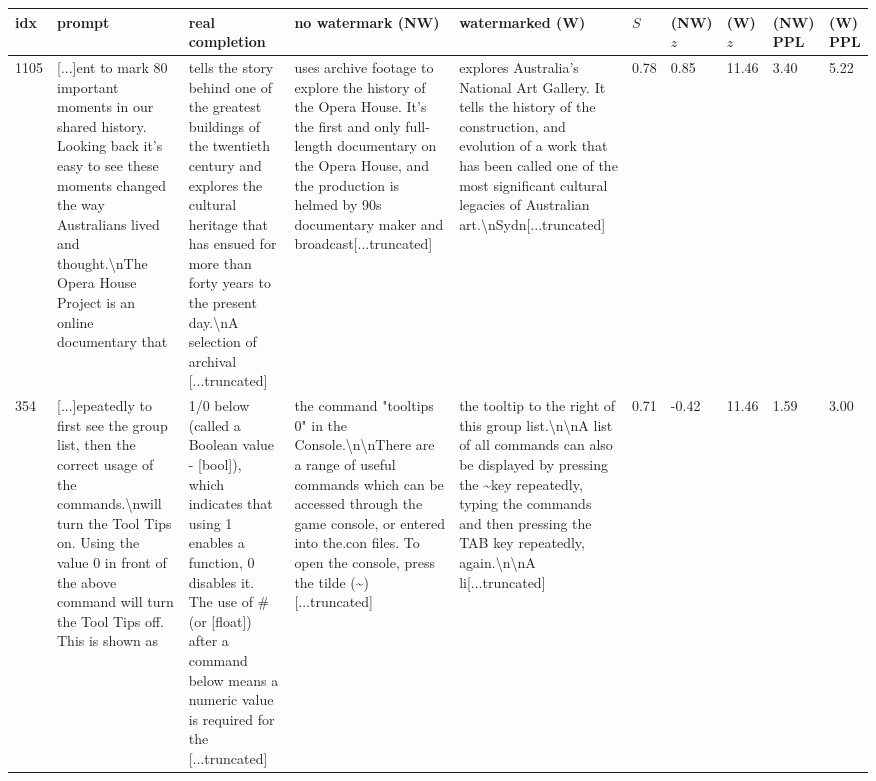 \documentclass{article}
\theoremstyle{plain}
\theoremstyle{definition}
\theoremstyle{remark}
\begin{document}
\begin{table}[t]
\tiny
\begin{tabular}{p{0.2cm}|p{2.75cm}|p{2.75cm}|p{2.75cm}|p{2.75cm}|p{0.2cm}|p{0.42cm}|p{0.42cm}|p{0.3cm}|p{0.3cm}}
\toprule
 idx &  prompt & real completion &  no watermark (NW) &  watermarked (W) &  $S$ &  (NW) $z$ &  (W) $z$ &  (NW) PPL &  (W) PPL \\
\midrule
1105 & [...]ent to mark 80 important moments in our shared history. Looking back it's easy to see these moments changed the way Australians lived and thought.\textbackslash nThe Opera House Project is an online documentary that &  tells the story behind one of the greatest buildings of the twentieth century and explores the cultural heritage that has ensued for more than forty years to the present day.\textbackslash nA selection of archival [...truncated] &    uses archive footage to explore the history of the Opera House. It's the first and only full-length documentary on the Opera House, and the production is helmed by 90s documentary maker and broadcast[...truncated] &     explores Australia's National Art Gallery. It tells the history of the construction, and evolution of a work that has been called one of the most significant cultural legacies of Australian art.\textbackslash nSydn[...truncated] &               0.78 &           0.85 &         11.46 &       3.40 &      5.22 \\\midrule
 354 & [...]epeatedly to first see the group list, then the correct usage of the commands.\textbackslash nwill turn the Tool Tips on. Using the value 0 in front of the above command will turn the Tool Tips off. This is shown as &   1/0 below (called a Boolean value - [bool]), which indicates that using 1 enables a function, 0 disables it. The use of \# (or [float]) after a command below means a numeric value is required for the [...truncated] &  the command "tooltips 0" in the Console.\textbackslash n\textbackslash nThere are a range of useful commands which can be accessed through the game console, or entered into the.con files. To open the console, press the tilde (\textasciitilde ) [...truncated] &  the tooltip to the right of this group list.\textbackslash n\textbackslash nA list of all commands can also be displayed by pressing the \textasciitilde  key repeatedly, typing the commands and then pressing the TAB key repeatedly, again.\textbackslash n\textbackslash nA li[...truncated] &               0.71 &          -0.42 &         11.46 &       1.59 &      3.00 \\\midrule

\end{tabular}
\end{table}
\end{document}
